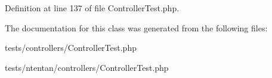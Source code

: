Definition at line 137 of file ControllerTest.php.



The documentation for this class was generated from the following files:\begin{DoxyCompactItemize}
\item 
tests/controllers/ControllerTest.php\item 
tests/ntentan/controllers/ControllerTest.php\end{DoxyCompactItemize}

